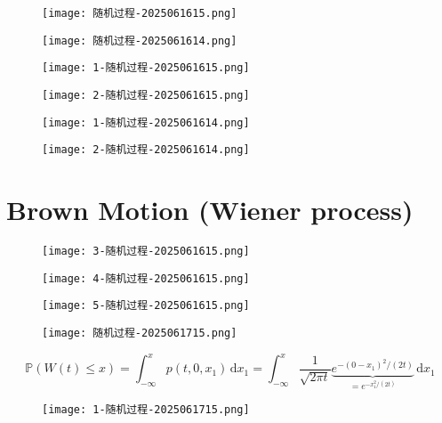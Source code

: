 \begin{figure}[H]
\centering
\texttt{[image: 随机过程-2025061615.png]}
\label{}
\end{figure}

\begin{figure}[H]
\centering
\texttt{[image: 随机过程-2025061614.png]}
\label{}
\end{figure}
\begin{figure}[H]
\centering
\texttt{[image: 1-随机过程-2025061615.png]}
\label{}
\end{figure}
\begin{figure}[H]
\centering
\texttt{[image: 2-随机过程-2025061615.png]}
\label{}
\end{figure}
\begin{figure}[H]
\centering
\texttt{[image: 1-随机过程-2025061614.png]}
\label{}
\end{figure}
\begin{figure}[H]
\centering
\texttt{[image: 2-随机过程-2025061614.png]}
\label{}
\end{figure}

\section{Brown Motion (Wiener process)}

\begin{figure}[H]
\centering
\texttt{[image: 3-随机过程-2025061615.png]}
\label{}
\end{figure}
\begin{figure}[H]
\centering
\texttt{[image: 4-随机过程-2025061615.png]}
\label{}
\end{figure}

\begin{figure}[H]
\centering
\texttt{[image: 5-随机过程-2025061615.png]}
\label{}
\end{figure}

\begin{figure}[H]
\centering
\texttt{[image: 随机过程-2025061715.png]}
\label{}
\end{figure}
\[
\mathbb{P}(W(t)\leq x)=\int_{-\infty}^{x} p(t,0,x_1) \, \mathrm{d}x_1 =\int_{-\infty }^{x} \frac{1}{\sqrt{ 2\pi t }}\underbrace{ e^{ -(0-x_1)^{2}/(2t) } }_{ =e^{ -x_1^{2}/(2t) } } \, \mathrm{d}x_1
\]
\begin{figure}[H]
\centering
\texttt{[image: 1-随机过程-2025061715.png]}
\label{}
\end{figure}

